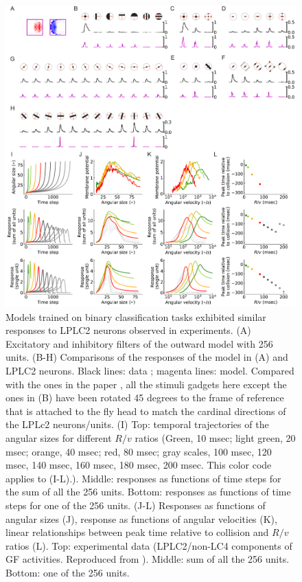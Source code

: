 \documentclass[pdftex,9pt,lineno]{elife}
\begin{document}
\begin{figure}
\begin{fullwidth}
\includegraphics[width=\linewidth]{figures/replication_paper.pdf}
\caption{Models trained on binary classification tasks exhibited similar responses to LPLC2 neurons observed in experiments. (A) Excitatory and inhibitory filters of the outward model with 256 units. (B-H) Comparisons of the responses of the model in (A) and LPLC2 neurons. Black lines: data \citep{klapoetke2017ultra}; magenta lines: model. Compared with the ones in the paper \citep{klapoetke2017ultra}, all the stimuli gadgets here except the ones in (B) have been rotated 45 degrees to the frame of reference that is attached to the fly head to match the cardinal directions of the LPLc2 neurons/units. (I) Top: temporal trajectories of the angular sizes for different $R/v$ ratios (Green, 10 msec; light green, 20 msec; orange, 40 msec; red, 80 msec; gray scales, 100 msec, 120 msec, 140 msec, 160 msec, 180 msec, 200 msec. This color code applies to (I-L).). Middle: responses as functions of time steps for the sum of all the 256 units. Bottom: responses as functions of time steps for one of the 256 units. (J-L) Responses as functions of angular sizes (J), response as functions of angular velocities (K), linear relationships between peak time relative to collision and $R/v$ ratios (L). Top: experimental data (LPLC2/non-LC4 components of GF activities. Reproduced from \citep{von2017feature,ache2019neural}). Middle: sum of all the 256 units. Bottom: one of the 256 units.}

\end{fullwidth}
\end{figure}
\end{document}
